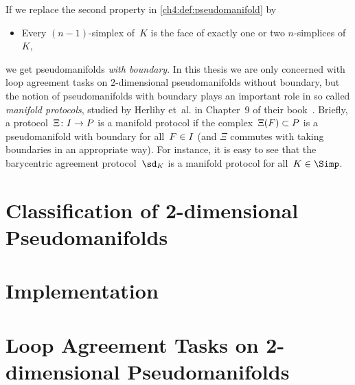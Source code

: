 \begin{thRemark}
    If we replace the second property in \cref{ch4:def:pseudomanifold} by
    \begin{itemize}[label=\textasteriskcentered]
        \item
            Every $(n{-}1)$-simplex of~$K$ is the face of exactly one
            or two $n$-simplices of~$K$,
    \end{itemize}
    we get pseudomanifolds \emph{with boundary}. In this thesis we are only
    concerned with loop agreement tasks on $2$-dimensional pseudomanifolds
    without boundary, but the notion of pseudomanifolds with boundary plays
    an important role in so called \emph{manifold protocols}, studied by
    Herlihy et~al. in Chapter~9 of their book~\cite{bookc:herlihyetal13}.
    Briefly, a protocol~$\Xi\colon I\to P$ is a manifold protocol if the
    complex~$\Xi(F)\subset P$ is a pseudomanifold with boundary for
    all~$F\in I$ (and $\Xi$ commutes with taking boundaries in an appropriate
    way). For instance, it is easy to see that the barycentric agreement
    protocol~$\sd_K$  is a manifold protocol
    for all~$K\in\Simp$.
\end{thRemark}


\section{Classification of 2-dimensional Pseudomanifolds}

\section{Implementation}

\section{Loop Agreement Tasks on 2-dimensional Pseudomanifolds}
